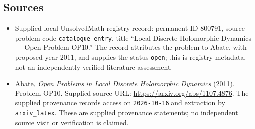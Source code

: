 \documentclass[11pt]{article}
\begin{document}
\subsection{Sources}
\begin{itemize}
\item Supplied local UnsolvedMath registry record: permanent ID \(800791\), source problem code \texttt{catalogue entry}, title ``Local Discrete Holomorphic Dynamics --- Open Problem OP10.'' The record attributes the problem to Abate, with proposed year \(2011\), and supplies the status \texttt{open}; this is registry metadata, not an independently verified literature assessment.
\item Abate, \emph{Open Problems in Local Discrete Holomorphic Dynamics} (2011), Problem OP10. Supplied source URL: \url{https://arxiv.org/abs/1107.4876}. The supplied provenance records access on \texttt{2026-10-16} and extraction by \texttt{arxiv\_latex}. These are supplied provenance statements; no independent source visit or verification is claimed.
\end{itemize}
\end{document}
